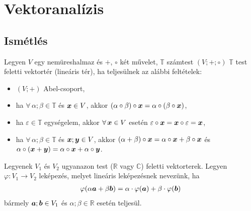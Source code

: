 \documentclass[main.tex]{subfiles}
\begin{document}
\section{Vektoranalízis}

\subsection{Ismétlés}


Legyen $V$ egy nemüreshalmaz és $+$, $\circ$ két művelet,
$\mathbb{T}$ számtest $\left( V; +; \circ \right)$ $\mathbb{T}$
test feletti vektortér (lineáris tér), ha teljesülnek az alábbi
feltételek:
\begin{itemize}
  \item $\left( V ; + \right)$ Abel-csoport,

  \item ha $\forall \, \alpha; \beta \in \mathbb{T}$
        és $\boldsymbol{x} \in V$,
        akkor $(\alpha \circ \beta) \circ \boldsymbol{x}
          = \alpha \circ (\beta \circ \boldsymbol{x})$,

  \item ha $\varepsilon \in \mathbb{T}$ egységelem,
        akkor $\forall \, \boldsymbol{x} \in V$ esetén
        $\varepsilon \circ \boldsymbol{x}
          = \boldsymbol{x} \circ \varepsilon
          = \boldsymbol{x}$,

  \item ha $\forall \, \alpha; \beta \in \mathbb{T}$
        és $\boldsymbol{x}; \boldsymbol{y} \in V$, akkor
        $(\alpha + \beta) \circ \boldsymbol{x}
          = \alpha \circ \boldsymbol{x} + \beta \circ \boldsymbol{x}$
        és $\alpha \circ (\boldsymbol{x} + \boldsymbol{y})
          = \alpha \circ \boldsymbol{x} + \alpha \circ \boldsymbol{y}$.
\end{itemize}




Legyenek $V_1$ és $V_2$ ugyanazon test ($\mathbb{R}$ vagy $\mathbb{C}$)
feletti vektorterek. Legyen $\varphi: V_1 \rightarrow V_2$ leképezés,
melyet lineáris leképezésnek nevezünk, ha
\begin{gather*}
  \varphi ( \alpha \boldsymbol{a} + \beta \boldsymbol{b} )
  = \alpha \cdot \varphi ( \boldsymbol{a} )
  + \beta \cdot \varphi ( \boldsymbol{b} )
\end{gather*}
bármely $\boldsymbol{a} ; \boldsymbol{b} \in V_1$ és
$\alpha; \beta \in \mathbb{R}$ esetén teljesül.
\end{document}
